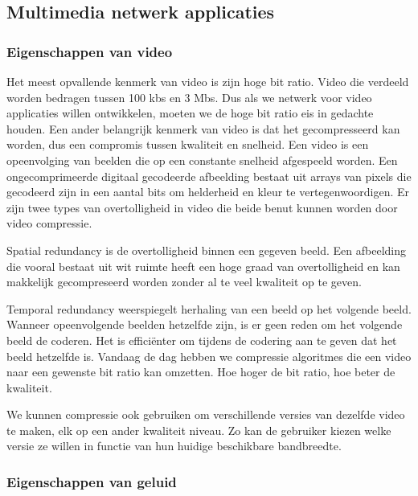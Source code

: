 \subsection{Multimedia netwerk applicaties}

\subsubsection{Eigenschappen van video}

Het meest opvallende kenmerk van video is zijn hoge bit ratio. Video die verdeeld worden bedragen tussen 100 kbs en 3 Mbs. Dus als we netwerk voor video applicaties willen ontwikkelen, moeten we de hoge bit ratio eis in gedachte houden. Een ander belangrijk kenmerk van video is dat het gecompresseerd kan worden, dus een compromis tussen kwaliteit en snelheid. Een video is een opeenvolging van beelden die op een constante snelheid afgespeeld worden. Een ongecomprimeerde digitaal gecodeerde afbeelding bestaat uit arrays van pixels die gecodeerd zijn in een aantal bits om helderheid en kleur te vertegenwoordigen. Er zijn twee types van overtolligheid in video die beide benut kunnen worden door video compressie.

Spatial redundancy is de overtolligheid binnen een gegeven beeld. Een afbeelding die vooral bestaat uit wit ruimte heeft een hoge graad van overtolligheid en kan makkelijk gecompreseerd worden zonder al te veel kwaliteit op te geven.

Temporal redundancy weerspiegelt herhaling van een beeld op het volgende beeld. Wanneer opeenvolgende beelden hetzelfde zijn, is er geen reden om het volgende beeld de coderen. Het is efficiënter om tijdens de codering aan te geven dat het beeld hetzelfde is.
Vandaag de dag hebben we compressie algoritmes die een video naar een gewenste bit ratio kan omzetten. Hoe hoger de bit ratio, hoe beter de kwaliteit.

We kunnen compressie ook gebruiken om verschillende versies van dezelfde video te maken, elk op een ander kwaliteit niveau. Zo kan de gebruiker kiezen welke versie ze willen in functie van hun huidige beschikbare bandbreedte.

\clearpage

\subsubsection{Eigenschappen van geluid}

